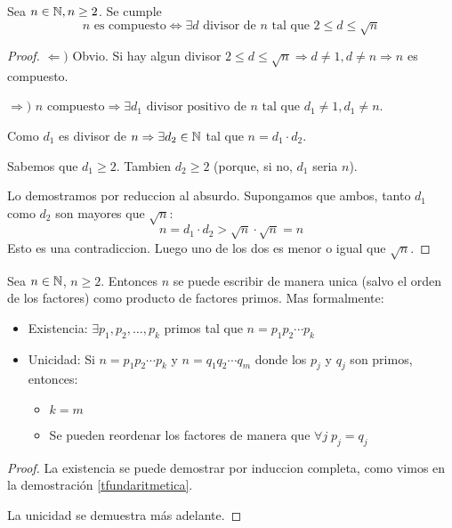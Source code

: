 \begin{theorem}
	Sea \(n \in \mathbb{N}, n \geq 2 \). Se cumple
	\[
		n \text{ es compuesto} \iff  \exists d \text{ divisor de } n \text{ tal que } 2 \leq d \leq \sqrt{n }
	\]
\end{theorem}
\begin{proof}
	\(\Leftarrow )\) Obvio. Si hay algun divisor \(2 \leq d \leq \sqrt{n } \Rightarrow d \neq 1, d \neq n \Rightarrow n\) es compuesto.
	
	\(\Rightarrow ) \) \(n \text{ compuesto} \Rightarrow \exists d_1 \text{ divisor positivo de } n \text{ tal que } d_1 \neq 1, d_1 \neq n\).
	
	Como \(d_1 \) es divisor de \(n \Rightarrow \exists d_2 \in \mathbb{N} \) tal que \(n = d_1 \cdot d_2 \).
	
	Sabemos que \(d_1 \geq  2 \). Tambien \(d_2 \geq  2\) (porque, si no, \(d_1 \) seria \(n\)).
	
	Lo demostramos por reduccion al absurdo. Supongamos que ambos, tanto \(d_1 \) como \(d_2 \) son mayores que \(\sqrt{n } \):
	\[
		n = d_1 \cdot d_2 > \sqrt{n} \cdot \sqrt{n} = n
	\]
	Esto es una contradiccion. Luego uno de los dos es menor o igual que \(\sqrt{n }\).
\end{proof}

\begin{theorem}
	Sea \(n \in \mathbb{N} \), \(n \geq  2 \). Entonces \(n \) se puede escribir de manera unica (salvo el orden de los factores) como producto de factores primos. Mas formalmente:
	\begin{itemize}
		\item Existencia: \(\exists p_1,p_2,\ldots,p_k \) primos tal que \(n = p_1 p_2 \cdots p_k \)
		\item Unicidad: Si \(n = p_1 p_2 \cdots p_k \) y \(n = q_1 q_2 \cdots q_m \) donde los \(p_j \) y \(q_j \) son primos, entonces: \begin{itemize}
			      \item \(k = m\)
			      \item Se pueden reordenar los factores de manera que \(\forall j\; p_j = q_j \)
		      \end{itemize}
	\end{itemize}
\end{theorem}

\begin{proof}
	\label{unicidadtfund}
	La existencia se puede demostrar por induccion completa, como vimos en la demostración \eqref{tfundaritmetica}.
	
	La unicidad se demuestra más adelante.
\end{proof}

